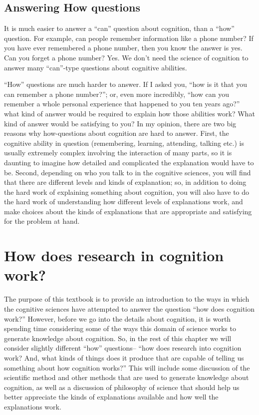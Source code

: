 \documentclass[
  oneside,
  12pt]{crumpbook}
\begin{document}
\hypertarget{answering-how-questions}{%
\subsection{Answering How questions}\label{answering-how-questions}}

It is much easier to answer a ``can'' question about cognition, than a ``how'' question. For example, can people remember information like a phone number? If you have ever remembered a phone number, then you know the answer is yes. Can you forget a phone number? Yes. We don't need the science of cognition to answer many ``can''-type questions about cognitive abilities.

``How'' questions are much harder to answer. If I asked you, ``how is it that you can remember a phone number?''; or, even more incredibly, ``how can you remember a whole personal experience that happened to you ten years ago?'' what kind of answer would be required to explain how those abilities work? What kind of answer would be satisfying to you? In my opinion, there are two big reasons why how-questions about cognition are hard to answer. First, the cognitive ability in question (remembering, learning, attending, talking etc.) is usually extremely complex involving the interaction of many parts, so it is daunting to imagine how detailed and complicated the explanation would have to be. Second, depending on who you talk to in the cognitive sciences, you will find that there are different levels and kinds of explanation; so, in addition to doing the hard work of explaining something about cognition, you will also have to do the hard work of understanding how different levels of explanations work, and make choices about the kinds of explanations that are appropriate and satisfying for the problem at hand.

\hypertarget{how-does-research-in-cognition-work}{%
\section{How does research in cognition work?}\label{how-does-research-in-cognition-work}}

The purpose of this textbook is to provide an introduction to the ways in which the cognitive sciences have attempted to answer the question ``how does cognition work?'' However, before we go into the details about cognition, it is worth spending time considering some of the ways this domain of science works to generate knowledge about cognition. So, in the rest of this chapter we will consider slightly different ``how'' questions-- ``how does research into cognition work? And, what kinds of things does it produce that are capable of telling us something about how cognition works?'' This will include some discussion of the scientific method and other methods that are used to generate knowledge about cognition, as well as a discussion of philosophy of science that should help us better appreciate the kinds of explanations available and how well the explanations work.
\end{document}
